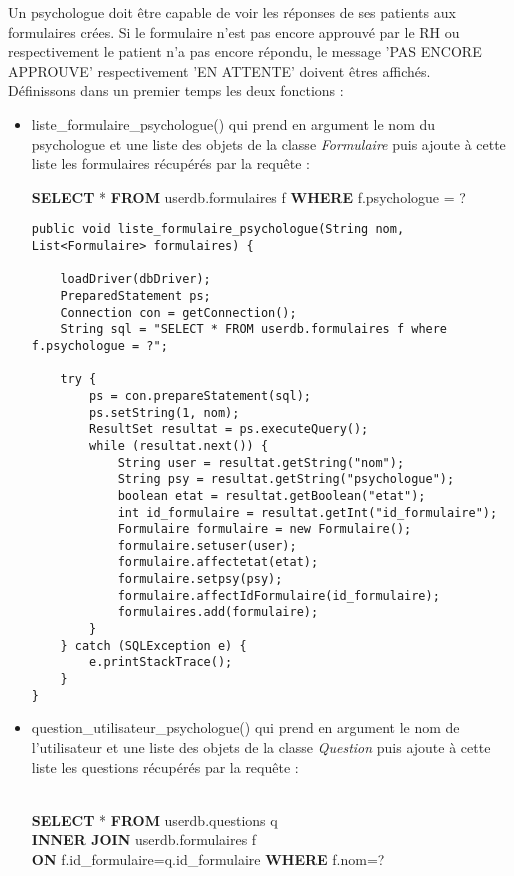 \documentclass[12]{article}
\begin{document}
Un psychologue doit être capable de voir les réponses de ses patients aux formulaires crées. Si le formulaire n'est pas encore approuvé par le RH ou respectivement le patient n'a pas encore répondu, le message 'PAS ENCORE APPROUVE' respectivement 'EN ATTENTE' doivent êtres affichés.\\
Définissons dans un premier temps les deux fonctions :\\
\begin{itemize}
\item liste\_formulaire\_psychologue() qui prend en argument le nom du psychologue et une liste des objets de la classe \textit{Formulaire} puis ajoute à cette liste les formulaires récupérés par la requête :\\

\begin{small}
\textbf{SELECT} * \textbf{FROM} userdb.formulaires f \textbf{WHERE} f.psychologue = ?
\end{small}

\begin{footnotesize}

\begin{lstlisting}
public void liste_formulaire_psychologue(String nom, List<Formulaire> formulaires) {

	loadDriver(dbDriver);
	PreparedStatement ps;
	Connection con = getConnection();
	String sql = "SELECT * FROM userdb.formulaires f where f.psychologue = ?";

	try {
		ps = con.prepareStatement(sql);
		ps.setString(1, nom);
		ResultSet resultat = ps.executeQuery();
		while (resultat.next()) {
			String user = resultat.getString("nom");
			String psy = resultat.getString("psychologue");
			boolean etat = resultat.getBoolean("etat");
			int id_formulaire = resultat.getInt("id_formulaire");
			Formulaire formulaire = new Formulaire();
			formulaire.setuser(user);
			formulaire.affectetat(etat);
			formulaire.setpsy(psy);
			formulaire.affectIdFormulaire(id_formulaire);
			formulaires.add(formulaire);
		}
	} catch (SQLException e) {
		e.printStackTrace();
	}
}
\end{lstlisting}



\end{footnotesize}





\item question\_utilisateur\_psychologue() qui prend en argument le nom de l'utilisateur et une liste des objets de la classe \textit{Question} puis ajoute à cette liste les questions récupérés par la requête :\\\\
\begin{small}
\textbf{SELECT} * \textbf{FROM} userdb.questions q \\
\textbf{INNER JOIN} userdb.formulaires f \\
\textbf{ON} f.id\_formulaire=q.id\_formulaire \textbf{WHERE} f.nom=?
\end{small}

\end{itemize}
\end{document}
